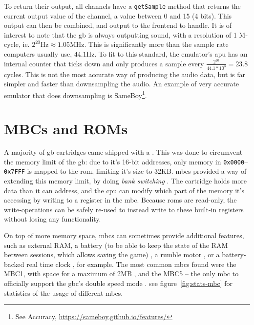 \documentclass[11pt]{informatics-report}
\begin{document}
To return their output, all channels have a \texttt{getSample} method that returns the current output value of the channel, a value between 0 and 15 (4 bits). This output can then be combined, and output to the frontend to handle. It is of interest to note that the \gls{gb} is always outputting sound, with a resolution of 1 M-cycle, ie. $2^{20}\text{Hz} \approx 1.05\text{MHz}$. This is significantly more than the sample rate computers usually use, $44.1\text{Hz}$. To fit to this standard, the emulator's \gls{apu} has an internal counter that ticks down and only produces a sample every $\frac{2^{20}}{44.1*10^3}=23.8$ cycles. This is not the most accurate way of producing the audio data, but is far simpler and faster than downsampling the audio. An example of very accurate emulator that does downsampling is SameBoy\footnote{See Accuracy, \url{https://sameboy.github.io/features/}}.

\section{MBCs and ROMs}

A majority of \gls{gb} cartridges came shipped with a . This was done to circumvent the memory limit of the \gls{gb}: due to it's 16-bit addresses, only memory in \texttt{0x0000}--\texttt{0x7FFF} is mapped to the \gls{rom}, limiting it's size to 32KB. \glspl{mbc} provided a way of extending this memory limit, by doing \textit{bank switching} \cite[MBCs]{pandoc}. The cartridge holds more data than it can address, and the \gls{cpu} can modify which part of the memory it's accessing by writing to a register in the \gls{mbc}. Because \glspl{rom} are read-only, the write-operations can be safely re-used to instead write to these built-in registers without losing any functionality.

On top of more memory space, \glspl{mbc} can sometimes provide additional features, such as external RAM, a battery (to be able to keep the state of the RAM between sessions, which allows saving the game) \cite[MBCs]{pandoc}, a rumble motor  \cite[MBC5]{pandoc}, or a battery-backed real time clock \cite[MBC3]{pandoc}, for example. The most common \glspl{mbc} found were the MBC1, with space for a maximum of 2MB \cite[MBC1]{pandoc}, and the MBC5 -- the only \gls{mbc} to officially support the \gls{gbc}'s double speed mode \cite{mbc5_only_double}. see figure~\ref{fig:stats-mbc} for statistics of the usage of different \glspl{mbc}.
\end{document}
